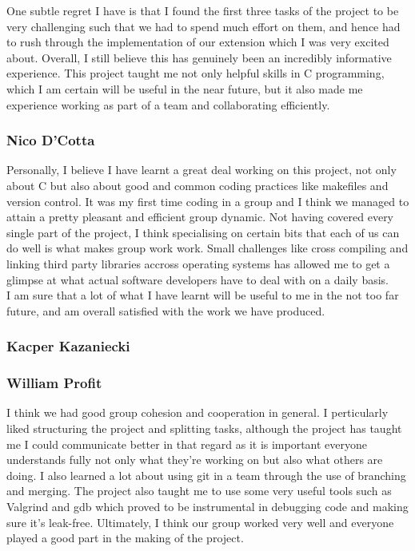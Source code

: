 \documentclass[11pt]{article}
\begin{document}
One subtle regret I have is that I found the first three tasks of the project to be very 
challenging such that we had to spend much effort on them, and hence had to rush through the 
implementation of our extension which I was very excited about. Overall, I still believe this has 
genuinely been an incredibly informative experience. This project taught me not only helpful skills in 
C programming, which I am certain will be useful in the near future, but it also made me experience 
working as part of a team and collaborating efficiently. 

\subsubsection{Nico D'Cotta}
Personally, I believe I have learnt a great deal working on this project, not
only about C but also about good and common coding practices like makefiles and
version control.
It was my first time coding in a group and I think we managed to attain a pretty
pleasant and efficient group dynamic. Not having covered every single part of
the project, I think specialising on certain bits that each of us can do well is
what makes group work work. Small challenges like cross compiling and linking
third party libraries accross operating systems has allowed me to get a glimpse
at what actual software developers have to deal with on a daily basis. \\
I am sure that a lot of what I have learnt will be useful to me in the not too
far future, and am overall satisfied with the work we have produced.


\subsubsection{Kacper Kazaniecki}
\subsubsection{William Profit}
I think we had good group cohesion and cooperation in general. I perticularly
liked structuring the project and splitting tasks, although the project has
taught me I could communicate better in that regard as it is important everyone
understands fully not only what they're working on but also what others are doing. I also
learned a lot about using git in a team through the use of branching and
merging. The project also taught me to use some very useful tools such as
Valgrind and gdb which proved to be instrumental in debugging code and making
sure it's leak-free. Ultimately, I think our group worked very well and everyone
played a good part in the making of the project.
\end{document}
